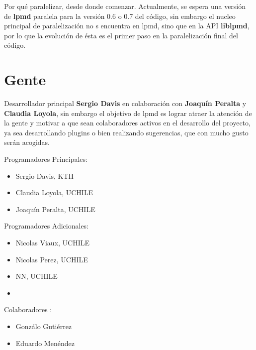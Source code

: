 \documentclass[a4paper,10pt]{scrbook}
\newcommand{\lpmd}{\textbf{lpmd }}
\begin{document}
Por qu\'e paralelizar, desde donde comenzar. Actualmente, se espera una versi\'on de \lpmd paralela para la versi\'on 0.6 o 0.7 del c\'odigo, sin embargo el nucleo principal de paralelizaci\'on no s encuentra en lpmd, sino que en la API \textbf{liblpmd}, por lo que la evoluci\'on de \'esta es el primer paso en la paralelizaci\'on final del c\'odigo.


\chapter{Gente}
\label{chap:auth}

Desarrollador principal \textbf{Sergio Davis} en colaboraci\'on con \textbf{Joaqu\'in Peralta} y \textbf{Claudia Loyola}, sin embargo el objetivo de lpmd es lograr atraer la atenci\'on de la gente y motivar a que sean colaboradores activos en el desarrollo del proyecto, ya sea desarrollando plugins o bien realizando sugerencias, que con mucho gusto ser\'an acogidas.

Programadores Principales:

\begin{itemize}
 \item Sergio Davis, KTH
 \item Claudia Loyola, UCHILE
 \item Joaqu\'in Peralta, UCHILE
\end{itemize}

Programadores Adicionales:

\begin{itemize}
 \item Nicolas Viaux, UCHILE
 \item Nicolas Perez, UCHILE
 \item NN, UCHILE
 \item 
\end{itemize}

Colaboradores :

\begin{itemize}
 \item Gonz\'alo Guti\'errez
 \item Eduardo Men\'endez
\end{itemize}
\end{document}
